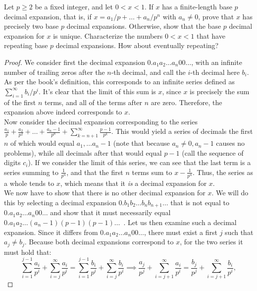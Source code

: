 \begin{exercise}{21}
Let $p\geq 2$ be a fixed integer, and let $0<x<1$. If $x$ has a finite-length base $p$ decimal expansion, that is, if $x=a_1/p+\dots+a_n/p^n$ with $a_n\neq 0$, prove that $x$ has precisely two base $p$ decimal expansions. Otherwise, show that the base $p$ decimal expansion for $x$ is unique. Characterize the numbers $0<x<1$ that have repeating base $p$ decimal expansions. How about eventually repeating?
\end{exercise}
\begin{proof}
    We consider first the decimal expansion $0.a_1 a_2 \ldots a_n 0 0 \ldots$, with an infinite number of trailing zeros after the $n$-th decimal, and call the $i$-th decimal here $b_i$. As per the book's definition, this corresponds to an infinite series defined as $\sum_{i=1}^{\infty}b_i/p^i$. It's clear that the limit of this sum is $x$, since $x$ is precisely the sum of the first $n$ terms, and all of the terms after $n$ are zero. Therefore, the expansion above indeed corresponds to $x$.\\

    Now consider the decimal expansion corresponding to the series $\frac{a_1}{p} + \frac{a_2}{p^2}+ \ldots + \frac{a_n - 1}{p^n} + \sum_{k=n+1}^{\infty}\frac{p-1}{p^k}$. This would yield a series of decimals the first $n$ of which would equal $a_1, \ldots a_n - 1$ (note that because $a_n \neq 0, a_n -1$ causes no problems), while all decimals after that would equal $p-1$ (call the sequence of digits $c_i$). If we consider the limit of this series, we can see that the last term is a series summing to $\frac{1}{p^n}$, and that the first $n$ terms sum to $x - \frac{1}{p^n}$. Thus, the series as a whole tends to $x$, which means that it \textit{is} a decimal expansion for $x$.\\

    We now have to show that there is no other decimal expansion for $x$. We will do this by selecting a decimal expansion $0.b_1 b_2 \ldots b_n b_{n+1} \ldots$ that is not equal to $0.a_1a_2 \ldots a_n 00\ldots$ and show that it must necessarily equal $0.a_1 a_2 \ldots (a_n-1) (p-1) (p-1)\ldots$\ . Let us then examine such a decimal expansion. Since it differs from $0.a_1 a_2 \ldots a_n 00\ldots$, there must exist a first $j$ such that $a_j \neq b_j$. Because both decimal expansions correspond to $x$, for the two series it must hold that:
    $$\sum_{i=1}^{j-1}\frac{a_i}{p^i} + \sum_{i=j}^{\infty}\frac{a_i}{p^i} = \sum_{i=1}^{j-1}\frac{b_i}{p^i} + \sum_{i=j}^{\infty}\frac{b_i}{p^i} \implies \frac{a_j}{p^j} + \sum_{i=j+1}^{\infty} \frac{a_i}{p^i} = \frac{b_j}{p^j} + \sum_{i=j+1}^{\infty}\frac{b_i}{p^i},$$


\end{proof}
